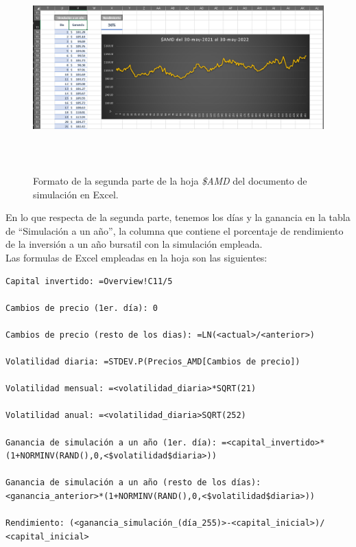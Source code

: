 \documentclass[letterpaper, 12pt]{article}
\begin{document}
\begin{justify}
        \begin{figure}[H]
            \centering
            \includegraphics[height=8cm,width=14cm]{formato_acciones_2.PNG}
            \caption{Formato de la segunda parte de la hoja \emph{\$AMD} del documento de simulación en Excel.}
        \end{figure}
        \justify
        En lo que respecta de la segunda parte, tenemos los días y la ganancia en la tabla de ``Simulación a un año'', la columna que contiene el porcentaje de rendimiento de la inversión a un año bursatil con la simulación empleada.
        \\\newline
        Las formulas de Excel empleadas en la hoja son las siguientes: 
            \begin{verbatim}
Capital invertido: =Overview!C11/5

Cambios de precio (1er. día): 0

Cambios de precio (resto de los dias): =LN(<actual>/<anterior>)

Volatilidad diaria: =STDEV.P(Precios_AMD[Cambios de precio])

Volatilidad mensual: =<volatilidad_diaria>*SQRT(21)

Volatilidad anual: =<volatilidad_diaria>SQRT(252)

Ganancia de simulación a un año (1er. día): =<capital_invertido>*
(1+NORMINV(RAND(),0,<$volatilidad$diaria>))

Ganancia de simulación a un año (resto de los días): 
<ganancia_anterior>*(1+NORMINV(RAND(),0,<$volatilidad$diaria>))

Rendimiento: (<ganancia_simulación_(día_255)>-<capital_inicial>)/
<capital_inicial>\end{verbatim}

\end{justify}
\end{document}
